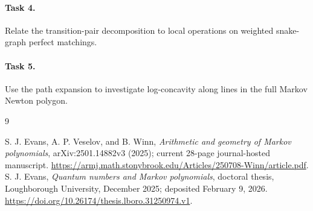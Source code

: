 \documentclass[11pt]{article}
\begin{document}
\paragraph{Task 4.}
Relate the transition-pair decomposition to local operations on
weighted snake-graph perfect matchings.

\paragraph{Task 5.}
Use the path expansion to investigate log-concavity along lines
in the full Markov Newton polygon.

\begin{thebibliography}{9}
\raggedright
{} S. J. Evans, A. P. Veselov, and B. Winn,
\emph{Arithmetic and geometry of Markov polynomials},
arXiv:2501.14882v3 (2025); current 28-page journal-hosted manuscript.
\url{https://armj.math.stonybrook.edu/Articles/250708-Winn/article.pdf}.
 S. J. Evans, \emph{Quantum numbers and Markov polynomials},
doctoral thesis, Loughborough University, December 2025;
deposited February 9, 2026.
\url{https://doi.org/10.26174/thesis.lboro.31250974.v1}.
\end{thebibliography}
\end{document}
